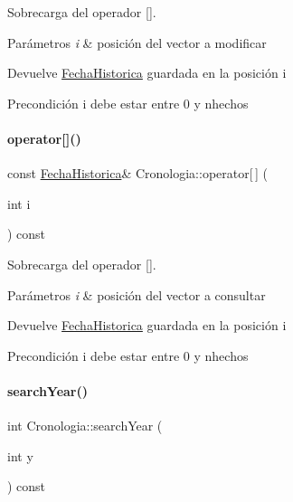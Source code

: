 Sobrecarga del operador \mbox{[}\mbox{]}. 


\begin{DoxyParams}{Parámetros}
{\em i} & posición del vector a modificar \\
\hline
\end{DoxyParams}
\begin{DoxyReturn}{Devuelve}
\hyperlink{classFechaHistorica}{Fecha\+Historica} guardada en la posición i 
\end{DoxyReturn}
\begin{DoxyPrecond}{Precondición}
i debe estar entre 0 y nhechos 
\end{DoxyPrecond}
\mbox{\label{classCronologia_a0133e630439d19e13a8a928e914236fa}} 
\paragraph{\texorpdfstring{operator[]()}{operator[]()}\hspace{0.1cm}{\footnotesize\ttfamily [2/2]}}
{\footnotesize\ttfamily const \hyperlink{classFechaHistorica}{Fecha\+Historica}\& Cronologia\+::operator\mbox{[}$\,$\mbox{]} (\begin{DoxyParamCaption}\item[{int}]{i }\end{DoxyParamCaption}) const}



Sobrecarga del operador \mbox{[}\mbox{]}. 


\begin{DoxyParams}{Parámetros}
{\em i} & posición del vector a consultar \\
\hline
\end{DoxyParams}
\begin{DoxyReturn}{Devuelve}
\hyperlink{classFechaHistorica}{Fecha\+Historica} guardada en la posición i 
\end{DoxyReturn}
\begin{DoxyPrecond}{Precondición}
i debe estar entre 0 y nhechos 
\end{DoxyPrecond}
\mbox{\label{classCronologia_a62515598c09d90d97ea36074c9722587}} 
\paragraph{\texorpdfstring{search\+Year()}{searchYear()}}
{\footnotesize\ttfamily int Cronologia\+::search\+Year (\begin{DoxyParamCaption}\item[{int}]{y }\end{DoxyParamCaption}) const}



